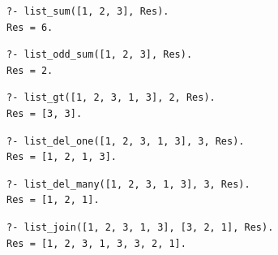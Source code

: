 \begin{lstlisting}[caption={Вопрос и ответ №2}, label={lst:q2}]
?- list_sum([1, 2, 3], Res).
Res = 6.
\end{lstlisting}

\begin{lstlisting}[caption={Вопрос и ответ №3}, label={lst:q3}]
?- list_odd_sum([1, 2, 3], Res).
Res = 2.
\end{lstlisting}

\begin{lstlisting}[caption={Вопрос и ответ №4}, label={lst:q4}]
?- list_gt([1, 2, 3, 1, 3], 2, Res).
Res = [3, 3].
\end{lstlisting}

\begin{lstlisting}[caption={Вопрос и ответ №5}, label={lst:q5}]
?- list_del_one([1, 2, 3, 1, 3], 3, Res).
Res = [1, 2, 1, 3].
\end{lstlisting}

\begin{lstlisting}[caption={Вопрос и ответ №6}, label={lst:q6}]
?- list_del_many([1, 2, 3, 1, 3], 3, Res).
Res = [1, 2, 1].
\end{lstlisting}

\begin{lstlisting}[caption={Вопрос и ответ №7}, label={lst:q7}]
?- list_join([1, 2, 3, 1, 3], [3, 2, 1], Res).
Res = [1, 2, 3, 1, 3, 3, 2, 1].
\end{lstlisting}
